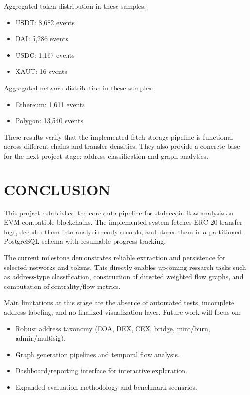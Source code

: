 \documentclass[a4paper,12pt]{report}
\begin{document}
Aggregated token distribution in these samples:
\begin{itemize}
\item USDT: 8,682 events
\item DAI: 5,286 events
\item USDC: 1,167 events
\item XAUT: 16 events
\end{itemize}

Aggregated network distribution in these samples:
\begin{itemize}
\item Ethereum: 1,611 events
\item Polygon: 13,540 events
\end{itemize}

These results verify that the implemented fetch-storage pipeline is functional across different
chains and transfer densities. They also provide a concrete base for the next project stage:
address classification and graph analytics.

\chapter{CONCLUSION}
This project established the core data pipeline for stablecoin flow analysis on EVM-compatible
blockchains. The implemented system fetches ERC-20 transfer logs, decodes them into analysis-ready
records, and stores them in a partitioned PostgreSQL schema with resumable progress tracking.

The current milestone demonstrates reliable extraction and persistence for selected networks and
tokens. This directly enables upcoming research tasks such as address-type classification,
construction of directed weighted flow graphs, and computation of centrality/flow metrics.

Main limitations at this stage are the absence of automated tests, incomplete address labeling, and
no finalized visualization layer. Future work will focus on:
\begin{itemize}
\item Robust address taxonomy (EOA, DEX, CEX, bridge, mint/burn, admin/multisig).
\item Graph generation pipelines and temporal flow analysis.
\item Dashboard/reporting interface for interactive exploration.
\item Expanded evaluation methodology and benchmark scenarios.
\end{itemize}
\end{document}
